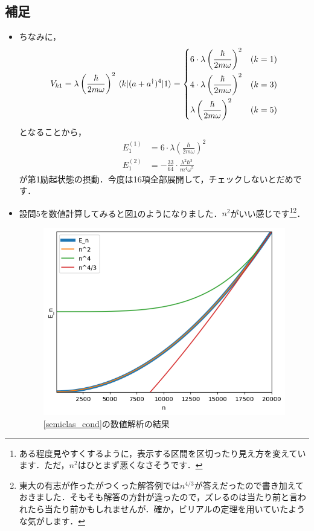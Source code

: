 \documentclass[a4paper,pdflatex,ja=standard]{bxjsarticle}
\begin{document}
\subsection*{補足}

\begin{itemize}
  \item 
  ちなみに，
  \begin{equation}
    V_{k1}
    =
    \lambda\left( \frac{\hbar}{2m\omega} \right)^2
    \ev*{k|(a+a^{\dagger})^4|1}
    =
    \begin{dcases}
      6\cdot\lambda\left( \frac{\hbar}{2m\omega} \right)^2
      &(k=1)
      \\
      4\cdot\lambda\left( \frac{\hbar}{2m\omega} \right)^2
      &(k=3)
      \\
      \lambda\left( \frac{\hbar}{2m\omega} \right)^2
      &(k=5)
    \end{dcases}
  \end{equation}
  となることから，
  \begin{align}
    E_{1}^{(1)}
    &=
    6\cdot\lambda\left( \frac{\hbar}{2m\omega} \right)^2
    \\
    E_{1}^{(2)}
    &=
    -\frac{33}{64}\cdot\frac{\lambda^2\hbar^3}{m^4\omega^5}
  \end{align}
  が第1励起状態の摂動．今度は16項全部展開して，チェックしないとだめです．

  \item 

  設問5を数値計算してみると図\ref{py}のようになりました．$n^2$がいい感じです\footnote{ある程度見やすくするように，表示する区間を区切ったり見え方を変えています．ただ，$n^2$はひとまず悪くなさそうです．}\footnote{東大の有志が作ったがつくった解答例では$n^{4/3}$が答えだったので書き加えておきました．そもそも解答の方針が違ったので，ズレるのは当たり前と言われたら当たり前かもしれませんが．確か，ビリアルの定理を用いていたような気がします．}．

  \begin{figure}[ht]
    \centering
    \includegraphics[keepaspectratio, scale=1.0]{temp/fig1.png}
    \caption{\eqref{semiclas_cond}の数値解析の結果}
    \label{py}
  \end{figure}

\end{itemize}
\end{document}

